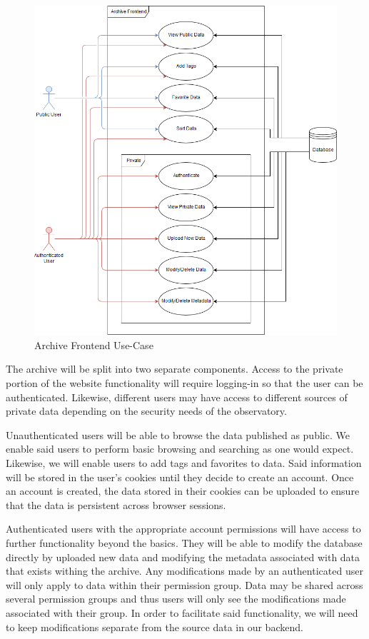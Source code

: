 \documentclass[12pt]{report}
\begin{document}
\begin{enumerate}
\begin{figure}[h]
	\centering
	\includegraphics[width=0.75\linewidth]{frontend_use_case}
	\caption{Archive Frontend Use-Case}
	\label{fig:archiveusecase}
\end{figure}

The archive will be split into two separate components. Access to the private portion of the website functionality will require logging-in so that the user can be authenticated. Likewise, different users may have access to different sources of private data depending on the security needs of the observatory.

Unauthenticated users will be able to browse the data published as public. We enable said users to perform basic browsing and searching as one would expect. Likewise, we will enable users to add tags and favorites to data. Said information will be stored in the user's cookies until they decide to create an account. Once an account is created, the data stored in their cookies can be uploaded to ensure that the data is persistent across browser sessions.

Authenticated users with the appropriate account permissions will have access to further functionality beyond the basics. They will be able to modify the database directly by uploaded new data and modifying the metadata associated with data that exists withing the archive. Any modifications made by an authenticated user will only apply to data within their permission group. Data may be shared across several permission groups and thus users will only see the modifications made associated with their group. In order to facilitate said functionality, we will need to keep modifications separate from the source data in our backend.


\end{enumerate}
\end{document}
